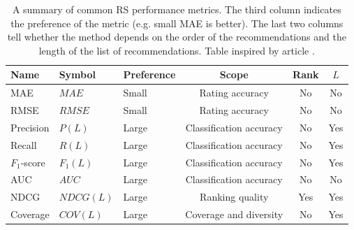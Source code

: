 \begin{table}[h]
\centering
\begin{tabular}{lllccc}
\toprule
Name & Symbol & Preference & Scope & Rank & $L$ \\
\midrule
MAE & $MAE$ & Small & Rating accuracy & No & No \\
RMSE & $RMSE$ & Small & Rating accuracy & No & No \\
Precision & $P(L)$ & Large & Classification accuracy & No & Yes \\
Recall & $R(L)$ & Large & Classification accuracy & No & Yes \\
$F_1$-score & $F_1(L)$ & Large & Classification accuracy & No & Yes \\
AUC & $AUC$ & Large & Classification accuracy & No & No \\
NDCG & $NDCG(L)$ & Large & Ranking quality & Yes & Yes \\
Coverage & $COV(L)$ & Large & Coverage and diversity & No & Yes \\
\bottomrule
\end{tabular}
\caption{A summary of common RS performance metrics. The third column indicates the preference of the metric (e.g. small MAE is better). The last two columns tell whether the method depends on the order of the recommendations and the length of the list of recommendations. Table inspired by article \parencite{lu2012recommender}.}
\label{tab:recommendation_metrics}
\end{table}
